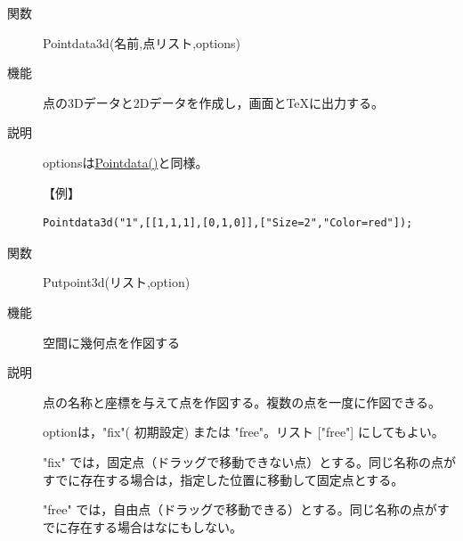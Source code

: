 \documentclass[papersize,a4paper,12pt,uplatex]{jsarticle}
\begin{document}
\begin{description}




\hypertarget{pointdata3d}{}
\item[関数]Pointdata3d(名前,点リスト,options)
\item[機能]点の3Dデータと2Dデータを作成し，画面と\TeX に出力する。
\item[説明]optionsは\hyperlink{pointdata}{Pointdata()}と同様。
\vspace{\baselineskip}

【例】
\begin{verbatim}
Pointdata3d("1",[[1,1,1],[0,1,0]],["Size=2","Color=red"]);
\end{verbatim}
\vspace{\baselineskip}

\hypertarget{putpoint3d}{}
\item[関数]Putpoint3d(リスト,option)
\item[機能]空間に幾何点を作図する
\item[説明]点の名称と座標を与えて点を作図する。複数の点を一度に作図できる。

optionは，"fix"( 初期設定) または "free"。リスト ["free"] にしてもよい。
 
"fix" では，固定点（ドラッグで移動できない点）とする。同じ名称の点がすでに存在する場合は，指定した位置に移動して固定点とする。

"free" では，自由点（ドラッグで移動できる）とする。同じ名称の点がすでに存在する場合はなにもしない。


\end{description}
\end{document}
